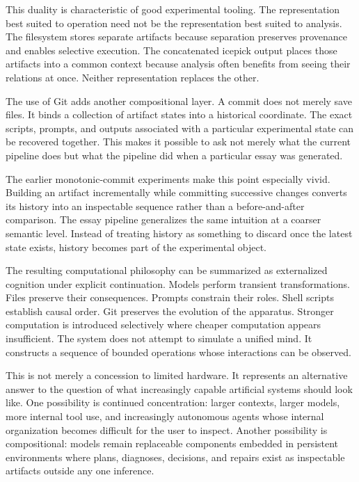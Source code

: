 \documentclass[11pt]{article}
\begin{document}
This duality is characteristic of good experimental tooling. The representation best suited to operation need not be the representation best suited to analysis. The filesystem stores separate artifacts because separation preserves provenance and enables selective execution. The concatenated icepick output places those artifacts into a common context because analysis often benefits from seeing their relations at once. Neither representation replaces the other.

The use of Git adds another compositional layer. A commit does not merely save files. It binds a collection of artifact states into a historical coordinate. The exact scripts, prompts, and outputs associated with a particular experimental state can be recovered together. This makes it possible to ask not merely what the current pipeline does but what the pipeline did when a particular essay was generated.

The earlier monotonic-commit experiments make this point especially vivid. Building an artifact incrementally while committing successive changes converts its history into an inspectable sequence rather than a before-and-after comparison. The essay pipeline generalizes the same intuition at a coarser semantic level. Instead of treating history as something to discard once the latest state exists, history becomes part of the experimental object.

The resulting computational philosophy can be summarized as externalized cognition under explicit continuation. Models perform transient transformations. Files preserve their consequences. Prompts constrain their roles. Shell scripts establish causal order. Git preserves the evolution of the apparatus. Stronger computation is introduced selectively where cheaper computation appears insufficient. The system does not attempt to simulate a unified mind. It constructs a sequence of bounded operations whose interactions can be observed.

This is not merely a concession to limited hardware. It represents an alternative answer to the question of what increasingly capable artificial systems should look like. One possibility is continued concentration: larger contexts, larger models, more internal tool use, and increasingly autonomous agents whose internal organization becomes difficult for the user to inspect. Another possibility is compositional: models remain replaceable components embedded in persistent environments where plans, diagnoses, decisions, and repairs exist as inspectable artifacts outside any one inference.
\end{document}
